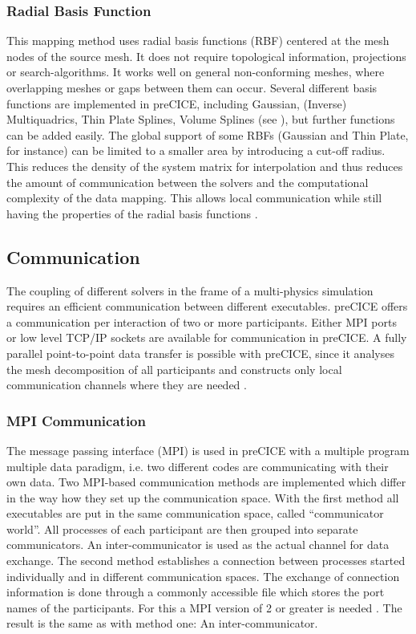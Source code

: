   \subsubsection{Radial Basis Function}\label{sec:Coupl-DataMapping-RBF}
   This mapping method uses radial basis functions (RBF) centered at the mesh nodes of the source mesh. It does not require topological information, projections or search-algorithms. It works well on general non-conforming meshes, where overlapping meshes or gaps between them can occur. Several different basis functions are implemented in preCICE, including Gaussian, (Inverse) Multiquadrics, Thin Plate Splines, Volume Splines (see \cite{bungartz2015fully}), but further functions can be added easily. The global support of some RBFs (Gaussian and Thin Plate, for instance) can be limited to a smaller area by introducing a cut-off radius. This reduces the density of the system matrix for interpolation and thus reduces the amount of communication between the solvers and the computational complexity of the data mapping. This allows local communication while still having the properties of the radial basis functions \cite{bungartz2015fully}.


 \subsection{Communication} \label{sec:Coupl-Communication}
  The coupling of different solvers in the frame of a multi-physics simulation requires an efficient communication between different executables. preCICE offers a communication per interaction of two or more participants. Either MPI ports or low level TCP/IP sockets are available for communication in preCICE. A fully parallel point-to-point data transfer is possible with preCICE, since it analyses the mesh decomposition of all participants and constructs only local communication channels where they are needed \cite{bungartz2015fully}.
 
  \subsubsection{MPI Communication}\label{sec:Coupl-Communication-MPI}
   The message passing interface (MPI) is used in preCICE with a multiple program multiple data paradigm, i.e. two different codes are communicating with their own data. Two MPI-based communication methods are implemented which differ in the way how they set up the communication space. With the first method all executables are put in the same communication space, called ``communicator world''. All processes of each participant are then grouped into separate communicators. An inter-communicator is used as the actual channel for data exchange.
   The second method establishes a connection between processes started individually and in different communication spaces. The exchange of connection information is done through a commonly accessible file which stores the port names of the participants. For this a MPI version of 2 or greater is needed \cite{gatzhammer2015efficient}. The result is the same as with method one: An inter-communicator.
   
